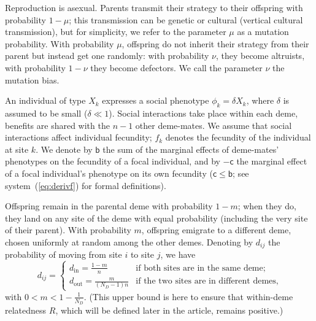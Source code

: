 \documentclass[11pt, letterpaper]{article}
\newcommand{\sysref}[1]{system~(\ref{#1})}
\newcommand{\bigO}[1]{O\left( #1 \right)}
\newcommand{\bb}{\mathsf{b}}
\newcommand{\cc}{\mathsf{c}}
\newcommand{\mutbias}{\nu}
\newcommand{\inn}{\textrm{in}}
\newcommand{\out}{\textrm{out}}
\newcommand{\din}{d_{\inn}}
\newcommand{\dout}{d_{\out}}
\newcommand{\ndemes}{N_D}
\newcommand{\selstr}{\delta}
\begin{document}
Reproduction is asexual. Parents transmit their strategy to their offspring with probability $1-\mu$; this transmission can be genetic or cultural (vertical cultural transmission), but for simplicity, we refer to the parameter $\mu$ as a mutation probability. With probability $\mu$, offspring do not inherit their strategy from their parent but instead get one randomly: with probability $\mutbias$, they become altruists, with probability $1-\mutbias$ they become defectors. We call the parameter $\mutbias$ the mutation bias. 

An individual of type $X_k$ expresses a social phenotype $\phi_k = \selstr X_k$, where $\selstr$ is assumed to be small ($\selstr \ll 1$). Social interactions take place within each deme, benefits are shared with the $n-1$ other deme-mates. We assume that social interactions affect individual fecundity; $f_k$ denotes the fecundity of the individual at site $k$. We denote by $\bb$ the sum of the marginal effects of deme-mates' phenotypes on the fecundity of a focal individual, and by $-\cc$ the marginal effect of a focal individual's phenotype on its own fecundity ($\cc \leq \bb$; see \sysref{eq:derivf} for formal definitions). %

Offspring remain in the parental deme with probability $1-m$; when they do, they land on any site of the deme with equal probability (including the very site of their parent). With probability $m$, offspring emigrate to a different deme, chosen uniformly at random among the other demes. Denoting by $d_{ij}$ the probability of moving from site $i$ to site $j$, we have
\begin{equation}\label{eq:defD}
d_{ij} = \begin{cases}
 \din =  \frac{1-m}{n} & \textrm{if both sites are in the same deme;}\\
 \dout = \frac{m}{(\ndemes-1) n} & \textrm{if the two sites are in different demes,} 
\end{cases}
\end{equation}
%
with $0 < m < 1-\frac{1}{\ndemes}$. (This upper bound is here to ensure that within-deme relatedness $R$, which will be defined later in the article, remains positive.)
\end{document}
